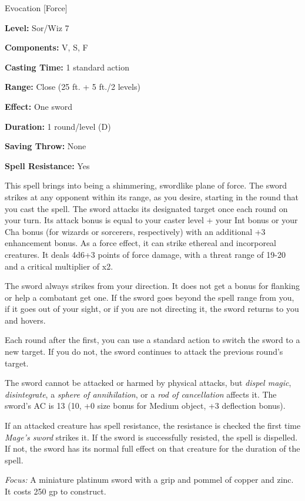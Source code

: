
Evocation [Force]

\textbf{Level:} Sor/Wiz 7

\textbf{Components:} V, S, F

\textbf{Casting Time:} 1 standard action

\textbf{Range:} Close (25 ft. + 5 ft./2 levels)

\textbf{Effect:} One sword

\textbf{Duration:} 1 round/level (D)

\textbf{Saving Throw:} None

\textbf{Spell Resistance:} Yes

This spell brings into being a shimmering, swordlike plane of force. The sword 
strikes at any opponent within its range, as you desire, starting in the round 
that you cast the spell. The sword attacks its designated target once each round 
on your turn. Its attack bonus is equal to your caster level + your Int bonus or 
your Cha bonus (for wizards or sorcerers, respectively) with an additional +3 enhancement 
bonus. As a force effect, it can strike ethereal and incorporeal creatures. It 
deals 4d6+3 points of force damage, with a threat range of 19-20 and a critical 
multiplier of x2.

The sword always strikes from your direction. It does not get a bonus for flanking 
or help a combatant get one. If the sword goes beyond the spell range from you, 
if it goes out of your sight, or if you are not directing it, the sword returns 
to you and hovers.

Each round after the first, you can use a standard action to switch the sword to 
a new target. If you do not, the sword continues to attack the previous round's 
target.

The sword cannot be attacked or harmed by physical attacks, but \textit{dispel 
magic}, \textit{disintegrate}, a \textit{sphere of annihilation}, or a \textit{rod 
of cancellation} affects it. The sword's AC is 13 (10, +0 size bonus for Medium 
object, +3 deflection bonus).

If an attacked creature has spell resistance, the resistance is checked the first 
time \textit{Mage's sword} strikes it. If the sword is successfully resisted, the 
spell is dispelled. If not, the sword has its normal full effect on that creature 
for the duration of the spell.

\textit{Focus:} A miniature platinum sword with a grip and pommel of copper and 
zinc. It costs 250 gp to construct.

